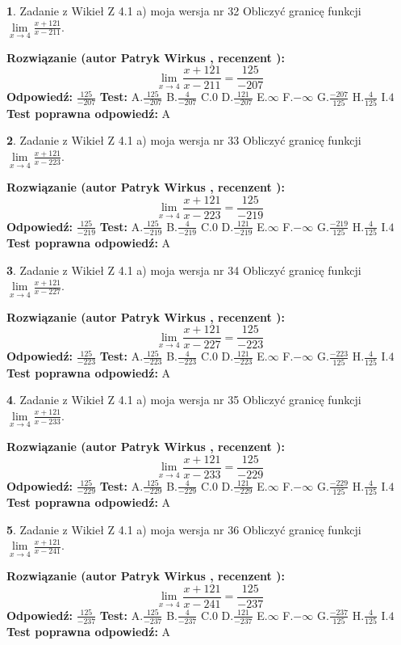 \documentclass[12pt, a4paper]{article}
\theoremstyle{definition} %
\newtheorem{zad}{}
\newcommand{\zadStart}[1]{\begin{zad}#1\newline}
\newcommand{\zadStop}{\end{zad}}
\newcommand{\rozwStart}[2]{\noindent \textbf{Rozwiązanie (autor #1 , recenzent #2): }\newline}
\newcommand{\rozwStop}{\newline}
\newcommand{\odpStart}{\noindent \textbf{Odpowiedź:}\newline}
\newcommand{\odpStop}{\newline}
\newcommand{\testStart}{\noindent \textbf{Test:}\newline}
\newcommand{\testStop}{\newline}
\newcommand{\kluczStart}{\noindent \textbf{Test poprawna odpowiedź:}\newline}
\newcommand{\kluczStop}{\newline}
\begin{document}
\zadStart{Zadanie z Wikieł Z 4.1 a) moja wersja nr 32}
Obliczyć granicę funkcji $\lim\limits_{x\to4}\frac{x+121}{x-211}$.
\zadStop
\rozwStart{Patryk Wirkus}{}
$$\lim\limits_{x\to4}\frac{x+121}{x-211} = \frac{125}{-207}$$
\rozwStop
\odpStart
$\frac{125}{-207}$
\odpStop
\testStart
A.$\frac{125}{-207}$
B.$\frac{4}{-207}$
C.$0$
D.$\frac{121}{-207}$
E.$\infty$
F.$-\infty$
G.$\frac{-207}{125}$
H.$\frac{4}{125}$
I.$4$
\testStop
\kluczStart
A
\kluczStop



\zadStart{Zadanie z Wikieł Z 4.1 a) moja wersja nr 33}
Obliczyć granicę funkcji $\lim\limits_{x\to4}\frac{x+121}{x-223}$.
\zadStop
\rozwStart{Patryk Wirkus}{}
$$\lim\limits_{x\to4}\frac{x+121}{x-223} = \frac{125}{-219}$$
\rozwStop
\odpStart
$\frac{125}{-219}$
\odpStop
\testStart
A.$\frac{125}{-219}$
B.$\frac{4}{-219}$
C.$0$
D.$\frac{121}{-219}$
E.$\infty$
F.$-\infty$
G.$\frac{-219}{125}$
H.$\frac{4}{125}$
I.$4$
\testStop
\kluczStart
A
\kluczStop



\zadStart{Zadanie z Wikieł Z 4.1 a) moja wersja nr 34}
Obliczyć granicę funkcji $\lim\limits_{x\to4}\frac{x+121}{x-227}$.
\zadStop
\rozwStart{Patryk Wirkus}{}
$$\lim\limits_{x\to4}\frac{x+121}{x-227} = \frac{125}{-223}$$
\rozwStop
\odpStart
$\frac{125}{-223}$
\odpStop
\testStart
A.$\frac{125}{-223}$
B.$\frac{4}{-223}$
C.$0$
D.$\frac{121}{-223}$
E.$\infty$
F.$-\infty$
G.$\frac{-223}{125}$
H.$\frac{4}{125}$
I.$4$
\testStop
\kluczStart
A
\kluczStop



\zadStart{Zadanie z Wikieł Z 4.1 a) moja wersja nr 35}
Obliczyć granicę funkcji $\lim\limits_{x\to4}\frac{x+121}{x-233}$.
\zadStop
\rozwStart{Patryk Wirkus}{}
$$\lim\limits_{x\to4}\frac{x+121}{x-233} = \frac{125}{-229}$$
\rozwStop
\odpStart
$\frac{125}{-229}$
\odpStop
\testStart
A.$\frac{125}{-229}$
B.$\frac{4}{-229}$
C.$0$
D.$\frac{121}{-229}$
E.$\infty$
F.$-\infty$
G.$\frac{-229}{125}$
H.$\frac{4}{125}$
I.$4$
\testStop
\kluczStart
A
\kluczStop



\zadStart{Zadanie z Wikieł Z 4.1 a) moja wersja nr 36}
Obliczyć granicę funkcji $\lim\limits_{x\to4}\frac{x+121}{x-241}$.
\zadStop
\rozwStart{Patryk Wirkus}{}
$$\lim\limits_{x\to4}\frac{x+121}{x-241} = \frac{125}{-237}$$
\rozwStop
\odpStart
$\frac{125}{-237}$
\odpStop
\testStart
A.$\frac{125}{-237}$
B.$\frac{4}{-237}$
C.$0$
D.$\frac{121}{-237}$
E.$\infty$
F.$-\infty$
G.$\frac{-237}{125}$
H.$\frac{4}{125}$
I.$4$
\testStop
\kluczStart
A
\kluczStop
\end{document}
